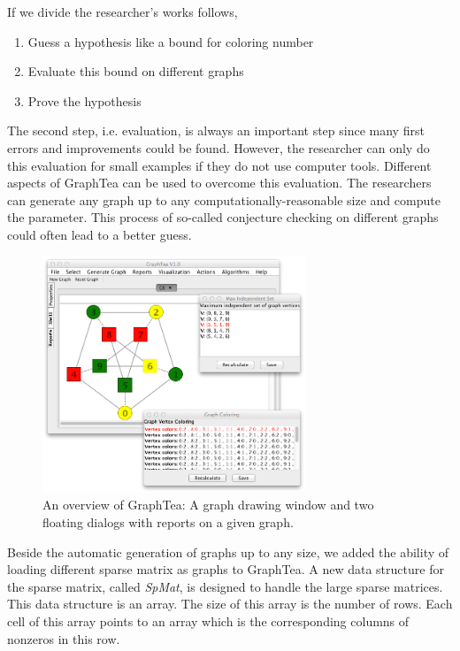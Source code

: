 \documentclass[12pt, twoside,a4paper,toc=bibliography]{scrbook}
\begin{document}
If we divide the researcher's works follows,
\begin{enumerate}
\item Guess a hypothesis like a bound for coloring number
\item Evaluate this bound on different graphs
\item Prove the hypothesis
\end{enumerate}
The second step, i.e. evaluation, is always an important step since many first errors and
improvements could be found.
However, the researcher can only do this evaluation for small examples if they do not
use computer tools.
Different aspects of GraphTea can be used to overcome this evaluation.
The researchers can generate any graph up to any computationally-reasonable size
and compute the parameter.
This process of so-called conjecture checking on different graphs could often lead to a better guess.
\begin{figure}
\centering
\includegraphics[width=0.7\textwidth]{graphtea}
\caption{An overview of GraphTea: A graph drawing window and
two floating dialogs with reports on a given graph.}
\label{f.graphtea}
\end{figure}

Beside the automatic generation of graphs up to any size, we added the ability of loading
different sparse matrix as graphs to GraphTea.
A new data structure for the sparse matrix, called \textit{SpMat}, is designed
to handle the large sparse matrices. This data structure is an array.
The size of this array is the number of rows. Each cell of this array points to
an array which is the corresponding columns of nonzeros in this row.
\end{document}
